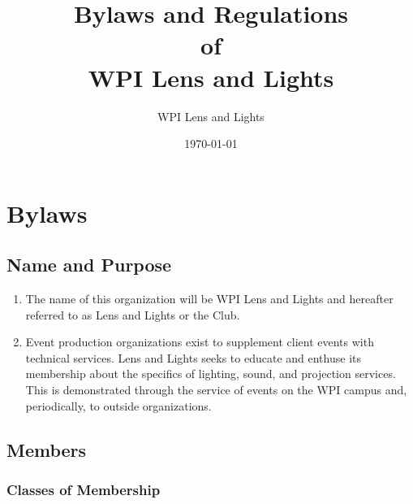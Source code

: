 \documentclass[12pt,letterpaper,oneside]{book}
\title{Bylaws and Regulations \\ of \\ WPI Lens and Lights}
\author{WPI Lens and Lights}
\date{\today}
\begin{document}
\maketitle

\tableofcontents
\newpage

\part{Bylaws}

\renewcommand{\chaptername}{Article}

\chapter{Name and Purpose}

\begin{enumerate}

\item The name of this organization will be WPI Lens and Lights and hereafter referred to as Lens and Lights or the Club.
\item Event production organizations exist to supplement client events with technical services. Lens and Lights seeks to educate and enthuse its membership about the specifics of lighting, sound, and projection services. This is demonstrated through the service of events on the WPI campus and, periodically, to outside organizations.

\end{enumerate}

\chapter{Members}

\section{Classes of Membership} \label{sec:classesofmembership}
\end{document}
